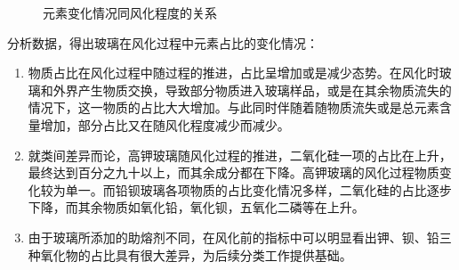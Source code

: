 \documentclass{my_paper}
\begin{document}
\begin{figure}[htbp]
    \centering  %
    
    \caption{元素变化情况同风化程度的关系}    %
    \label{bqu}    %
\end{figure}
分析数据，得出玻璃在风化过程中元素占比的变化情况：
\begin{enumerate}
    \item 物质占比在风化过程中随过程的推进，占比呈增加或是减少态势。在风化时玻璃和外界产生物质交换，导致部分物质进入玻璃样品，或是在其余物质流失的情况下，这一物质的占比大大增加。与此同时伴随着随物质流失或是总元素含量增加，部分占比又在随风化程度减少而减少。
    \item 就类间差异而论，高钾玻璃随风化过程的推进，二氧化硅一项的占比在上升，最终达到百分之九十以上，而其余成分都在下降。高钾玻璃的风化过程物质变化较为单一。而铅钡玻璃各项物质的占比变化情况多样，二氧化硅的占比逐步下降，而其余物质如氧化铅，氧化钡，五氧化二磷等在上升。
    \item 由于玻璃所添加的助熔剂不同，在风化前的指标中可以明显看出钾、钡、铅三种氧化物的占比具有很大差异，为后续分类工作提供基础。
\end{enumerate}
\end{document}
